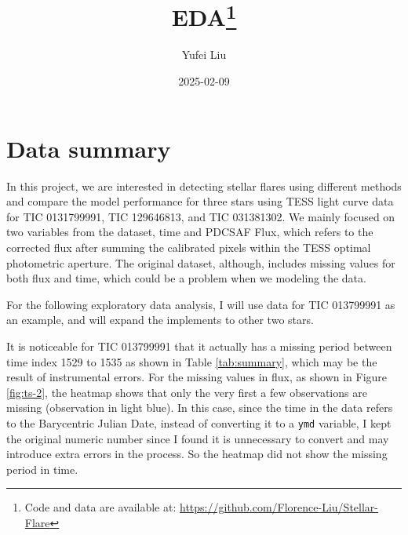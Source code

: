 \documentclass[
]{article}
\title{EDA\thanks{Code and data are available at: \url{https://github.com/Florence-Liu/Stellar-Flare}}}
\author{Yufei Liu}
\date{2025-02-09}
\begin{document}
\maketitle

\section{Data summary}\label{data-summary}

In this project, we are interested in detecting stellar flares using different methods and compare the model performance for three stars using TESS light curve data for TIC 0131799991, TIC 129646813, and TIC 031381302. We mainly focused on two variables from the dataset, time and PDCSAF Flux, which refers to the corrected flux after summing the calibrated pixels within the TESS optimal photometric aperture. The original dataset, although, includes missing values for both flux and time, which could be a problem when we modeling the data.

For the following exploratory data analysis, I will use data for TIC 013799991 as an example, and will expand the implements to other two stars.

It is noticeable for TIC 013799991 that it actually has a missing period between time index 1529 to 1535 as shown in Table \ref{tab:summary}, which may be the result of instrumental errors. For the missing values in flux, as shown in Figure \ref{fig:ts-2}, the heatmap shows that only the very first a few observations are missing (observation in light blue). In this case, since the time in the data refers to the Barycentric Julian Date, instead of converting it to a \texttt{ymd} variable, I kept the original numeric number since I found it is unnecessary to convert and may introduce extra errors in the process. So the heatmap did not show the missing period in time.
\end{document}
